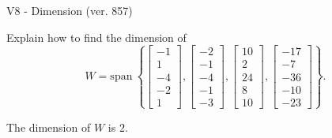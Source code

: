 \begin{exercise}
  \begin{exerciseTitle}V8 - Dimension (ver. 857)\end{exerciseTitle}
  \begin{exerciseStatement}
    Explain how to find the dimension of 
\[W=\mathrm{span}\ \left\{\left[\begin{array}{r}
-1 \\
1 \\
-4 \\
-2 \\
1
\end{array}\right] , \left[\begin{array}{r}
-2 \\
-1 \\
-4 \\
-1 \\
-3
\end{array}\right] , \left[\begin{array}{r}
10 \\
2 \\
24 \\
8 \\
10
\end{array}\right] , \left[\begin{array}{r}
-17 \\
-7 \\
-36 \\
-10 \\
-23
\end{array}\right]\right\}.\]



  \end{exerciseStatement}
  \begin{exerciseAnswer}
   The dimension of \(W\) is  \(2\).
  


  \end{exerciseAnswer}
\end{exercise}